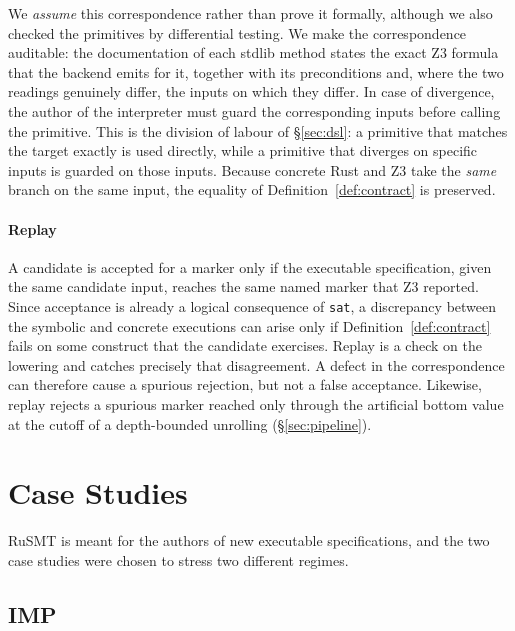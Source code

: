 \documentclass[sigconf,screen]{acmart}
\theoremstyle{definition}
\theoremstyle{remark}
\newcommand{\rusmt}{RuSMT}
\newcommand{\imp}{IMP}
\newcommand{\code}[1]{\texttt{#1}}
\begin{document}
We \emph{assume} this correspondence rather than prove it formally, although we also checked the primitives by differential testing. We make the correspondence auditable: the documentation of each stdlib method states the exact Z3 formula that the backend emits for it, together with its preconditions and, where the two readings genuinely differ, the inputs on which they differ. In case of divergence, the author of the interpreter must guard the corresponding inputs before calling the primitive. This is the division of labour of \S\ref{sec:dsl}: a primitive that matches the target exactly is used directly, while a primitive that diverges on specific inputs is guarded on those inputs. Because concrete Rust and Z3 take the \emph{same} branch on the same input, the equality of Definition~\ref{def:contract} is preserved.

\paragraph{Replay}

A candidate is accepted for a marker only if the executable specification, given the same candidate input, reaches the same named marker that Z3 reported. Since acceptance is already a logical consequence of \code{sat}, a discrepancy between the symbolic and concrete executions can arise only if Definition~\ref{def:contract} fails on some construct that the candidate exercises. Replay is a check on the lowering and catches precisely that disagreement. A defect in the correspondence can therefore cause a spurious rejection, but not a false acceptance. Likewise, replay rejects a spurious marker reached only through the artificial bottom value at the cutoff of a depth-bounded unrolling (\S\ref{sec:pipeline}).

\section{Case Studies}
\label{sec:cases}

\rusmt{} is meant for the authors of new executable specifications, and the two
case studies were chosen to stress two different regimes.

\subsection{\imp{}}
\label{sec:imp}
\end{document}
